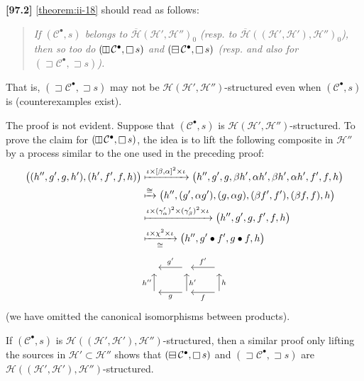 \documentclass[a4paper,fleqn]{article}
\theoremstyle{plain}
\theoremstyle{definition}
\newenvironment{longcomm}[1]
  {\noindent\textbf{[#1]}\rmfamily}
  {}
\newcommand{\CC}{\mathcal{C}}
\newcommand{\HH}{\mathcal{H}}
\newcommand{\hsqbox}{{\boxminus}}
\newcommand{\vsqbox}{{\rotatebox{90}{$\boxminus$}}}
\DeclareMathOperator{\sq}{\square}
\DeclareMathOperator{\hsq}{\raisebox{-.05em}{$\hsqbox$}}
\DeclareMathOperator{\vsq}{\raisebox{-.1em}{$\vsqbox$}}
\DeclareMathOperator{\trio}{\sqsupset}
\begin{document}
\begin{longcomm}{97.2}
  \cref{theorem:ii-18} should read as follows:
  \begin{quote}
    \itshape
    If $(\CC^\bullet,s)$ belongs to $\overline{\HH}(\HH',\HH'')_0$ (resp. to $\overline{\HH}((\HH',\HH'),\HH'')_0$), then so too do $(\vsq\CC^\bullet,\sq s)$ and $(\hsq\CC^\bullet,\sq s)$ (resp. and also for $(\trio\CC^\bullet,\trio s)$).
  \end{quote}
  That is, $(\trio\CC^\bullet,\trio s)$ may not be $\HH(\HH',\HH'')$-structured even when $(\CC^\bullet,s)$ is (counterexamples exist).

  The proof is not evident.
  Suppose that $(\CC^\bullet,s)$ is $\HH(\HH',\HH'')$-structured.
  To prove the claim for $(\vsq\CC^\bullet,\sq s)$, the idea is to lift the following composite in $\HH''$ by a process similar to the one used in the preceding proof:
  \[
    \begin{aligned}
      \big(
        (h'',g',g,h'),
        (h',f',f,h)
      \big)
      &\xmapsto{\iota\times[\beta,\alpha]^2\times\iota}
      \big(
        h'', g', g, \beta h', \alpha h', \beta h', \alpha h', f', f, h
      \big)
    \\&\xmapsto{\cong}
      \big(
        h'',
        (g',\alpha g'),
        (g,\alpha g),
        (\beta f',f'),
        (\beta f, f),
        h
      \big)
    \\&\xmapsto{\iota\times(\gamma'_\alpha)^2\times(\gamma'_\beta)^2\times\iota}
      \big(
        h'', g', g, f', f, h
      \big)
    \\&\xmapsto[\cong]{\iota\times\chi^2\times\iota}
      \big(
        h'', g'\bullet f', g\bullet f, h
      \big)
    \end{aligned}
  \]
  \[
    \begin{tikzcd}
      {}
      & {} \ar[l,swap,"g'"]
      & {} \ar[l,swap,"f'"]
    \\{} \ar[u,"h''"]
      & {} \ar[l,"g"] \ar[u,swap,"h'"]
      & {} \ar[l,"f"] \ar[u,swap,"h"]
    \end{tikzcd}
  \]
  (we have omitted the canonical isomorphisms between products).

  If $(\CC^\bullet,s)$ is $\HH((\HH',\HH'),\HH'')$-structured, then a similar proof only lifting the sources in $\HH'\subset\HH''$ shows that $(\hsq\CC^\bullet,\sq s)$ and $(\trio\CC^\bullet,\trio s)$ are $\HH((\HH',\HH'),\HH'')$-structured.
\end{longcomm}
\end{document}
